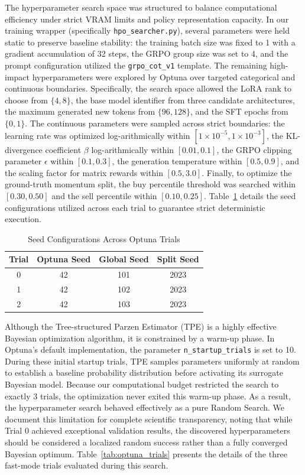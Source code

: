     The hyperparameter search space was structured to balance computational efficiency under strict VRAM limits and policy representation capacity. In our training wrapper (specifically \texttt{hpo\_searcher.py}), several parameters were held static to preserve baseline stability: the training batch size was fixed to 1 with a gradient accumulation of 32 steps, the GRPO group size was set to 4, and the prompt configuration utilized the \texttt{grpo\_cot\_v1} template. The remaining high-impact hyperparameters were explored by Optuna over targeted categorical and continuous boundaries. Specifically, the search space allowed the LoRA rank to choose from $\{4, 8\}$, the base model identifier from three candidate architectures, the maximum generated new tokens from $\{96, 128\}$, and the SFT epochs from $\{0, 1\}$. The continuous parameters were sampled across strict boundaries: the learning rate was optimized log-arithmically within $[1\times 10^{-5}, 1\times 10^{-3}]$, the KL-divergence coefficient $\beta$ log-arithmically within $[0.01, 0.1]$, the GRPO clipping parameter $\epsilon$ within $[0.1, 0.3]$, the generation temperature within $[0.5, 0.9]$, and the scaling factor for matrix rewards within $[0.5, 3.0]$. Finally, to optimize the ground-truth momentum split, the buy percentile threshold was searched within $[0.30, 0.50]$ and the sell percentile within $[0.10, 0.25]$. Table~\ref{tab:seed_config} details the seed configurations utilized across each trial to guarantee strict deterministic execution.

    
    \begin{table}[htbp]
    \centering
    \small
    \caption{Seed Configurations Across Optuna Trials}
    \label{tab:seed_config}
    \begin{tabular}{cccc}
    \hline
    \textbf{Trial} & \textbf{Optuna Seed} & \textbf{Global Seed} & \textbf{Split Seed} \\
    \hline
    0 & 42 & 101 & 2023 \\
    1 & 42 & 102 & 2023 \\
    2 & 42 & 103 & 2023 \\
    \hline
    \end{tabular}
    \end{table}


    Although the Tree-structured Parzen Estimator (TPE) is a highly effective Bayesian optimization algorithm, it is constrained by a warm-up phase. In Optuna's default implementation, the parameter \texttt{n\_startup\_trials} is set to 10. During these initial startup trials, TPE samples parameters uniformly at random to establish a baseline probability distribution before activating its surrogate Bayesian model. Because our computational budget restricted the search to exactly 3 trials, the optimization never exited this warm-up phase. As a result, the hyperparameter search behaved effectively as a pure Random Search. We document this limitation for complete scientific transparency, noting that while Trial 0 achieved exceptional validation results, the discovered hyperparameters should be considered a localized random success rather than a fully converged Bayesian optimum. Table~\ref{tab:optuna_trials} presents the details of the three fast-mode trials evaluated during this search.

